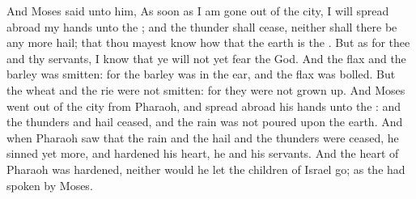 \begin{biblechapter}
\verse And Moses said unto him, As soon as I am gone out of the city, I will spread abroad my hands unto the \LORD; and the thunder shall cease, neither shall there be any more hail; that thou mayest know how that the earth is the \LORDs.
\verse But as for thee and thy servants, I know that ye will not yet fear the \LORD God.
\verse And the flax and the barley was smitten: for the barley was in the ear, and the flax was bolled.
\verse But the wheat and the rie were not smitten: for they were not grown up.
\verse And Moses went out of the city from Pharaoh, and spread abroad his hands unto the \LORD: and the thunders and hail ceased, and the rain was not poured upon the earth.
\verse And when Pharaoh saw that the rain and the hail and the thunders were ceased, he sinned yet more, and hardened his heart, he and his servants.
\verse And the heart of Pharaoh was hardened, neither would he let the children of Israel go; as the \LORD had spoken by Moses.
\end{biblechapter}

